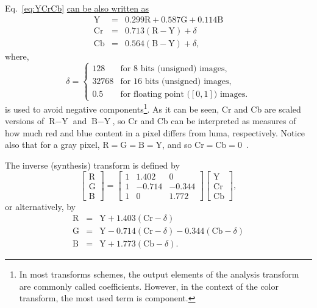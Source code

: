 Eq.~\ref{eq:YCrCb}
\href{https://docs.opencv.org/3.4/de/d25/imgproc_color_conversions.html}{can
  be also written as}
\begin{equation}
  \begin{array}{lcl}
    \text{Y}  & = & 0.299\text{R} + 0.587\text{G} + 0.114\text{B} \\
    \text{Cr} & = & 0.713(\text{R} - \text{Y}) + \delta \\
    \text{Cb} & = & 0.564(\text{B} - \text{Y}) + \delta,
  \end{array}
  \label{eq:analysis}
\end{equation}
where,
\begin{equation}
  \delta = \left\{
  \begin{array}{ll}
    128 & \text{for 8 bits (unsigned) images},\\
    32768 & \text{for 16 bits (unsigned) images},\\
    0.5 & \text{for floating point (}[0,1]\text{) images}.
  \end{array}
  \right.
  \label{eq:iYCrCb}
\end{equation}
is used to avoid negative components\footnote{In most transforms
schemes, the output elements of the analysis transform are commonly
called coefficients. However, in the context of the color transform,
the most used term is component.}. As it can be seen, Cr and Cb are
scaled versions of $\text{R} - \text{Y}$ and $\text{B} - \text{Y}$, so
Cr and Cb can be interpreted as measures of how much red and blue
content in a pixel differs from luma, respectively. Notice also that
for a gray pixel, $\text{R}=\text{G}=\text{B}=\text{Y}$, and so
$\text{Cr}=\text{Cb}=0$~\cite{malvar2008lifting}.

The inverse (synthesis) transform is defined by
\begin{equation}
  \begin{bmatrix}
    \text{R} \\
    \text{G} \\
    \text{B}
  \end{bmatrix}
  =
  \begin{bmatrix}
    1  &  1.402  & 0 \\ 
    1  &  -0.714  &  -0.344 \\ 
    1  & 0  & 1.772
  \end{bmatrix}
  \begin{bmatrix}
    \text{Y} \\
    \text{Cr} \\
    \text{Cb}
  \end{bmatrix},
\end{equation}
or alternatively, by
\begin{equation}
  \begin{array}{lcl}
    \text{R} & = & \text{Y} + 1.403(\text{Cr} - \delta) \\
    \text{G} & = & \text{Y} - 0.714(\text{Cr} - \delta) - 0.344(\text{Cb} - \delta)\\
    \text{B} & = & \text{Y} + 1.773(\text{Cb} - \delta).
  \end{array}
  \label{eq:synthesis}
\end{equation}


